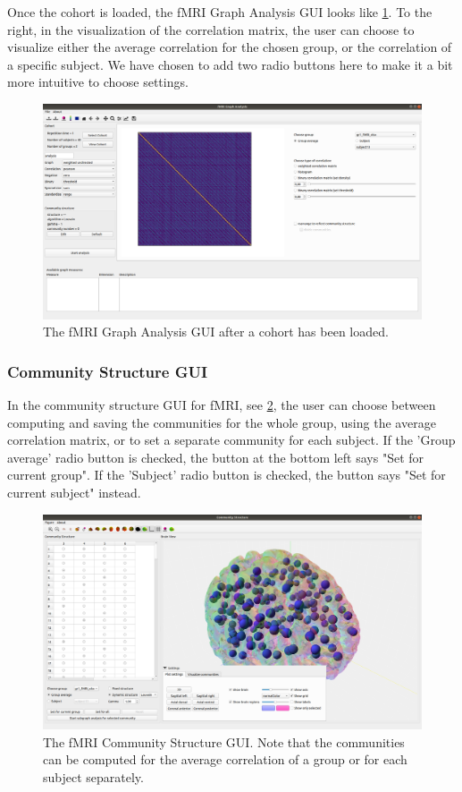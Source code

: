 \documentclass{article}
\begin{document}
Once the cohort is loaded, the fMRI Graph Analysis GUI looks like \cref{fig:fmri_ga}. To the right, in the visualization of the correlation matrix, the user can choose to visualize either the average correlation for the chosen group, or the correlation of a specific subject. We have chosen to add two radio buttons here to make it a bit more intuitive to choose settings.

\begin{figure}[H]
    \centering
    \includegraphics[width=0.9\linewidth]{fmri_ga.png}
    \caption{The fMRI Graph Analysis GUI after a cohort has been loaded.}
    \label{fig:fmri_ga}
\end{figure}


\subsubsection{Community Structure GUI}

In the community structure GUI for fMRI, see \cref{fig:fmri_cs}, the user can choose between computing and saving the communities for the whole group, using the average correlation matrix, or to set a separate community for each subject. If the 'Group average' radio button is checked, the button at the bottom left says "Set for current group". If the 'Subject' radio button is checked, the button says "Set for current subject" instead. 

\begin{figure}[H]
    \centering
    \includegraphics[width=0.9\linewidth]{fmri_cs.png}
    \caption{The fMRI Community Structure GUI. Note that the communities can be computed for the average correlation of a group or for each subject separately.}
    \label{fig:fmri_cs}
\end{figure}
\end{document}
